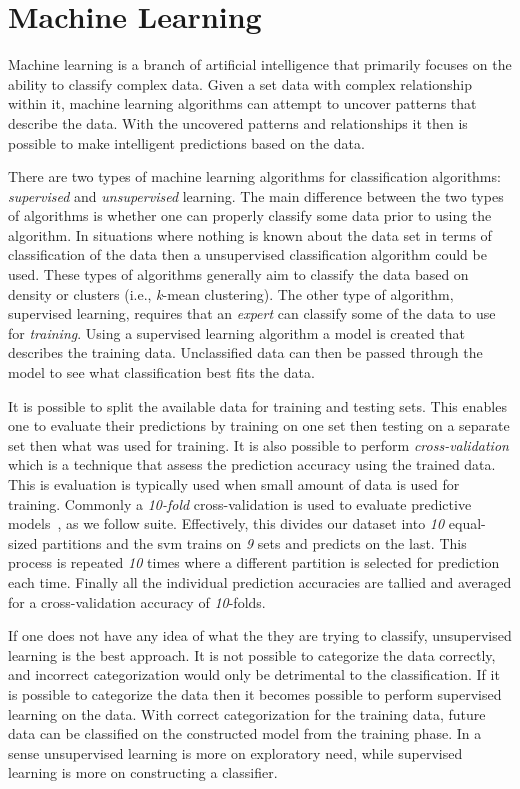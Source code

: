 \section{Machine Learning}
\label{sec:background_machine_learning}
Machine learning is a branch of artificial intelligence that primarily focuses on the ability to classify complex data. Given a set data with complex relationship within it, machine learning algorithms can attempt to uncover patterns that describe the data. With the uncovered patterns and relationships it then is possible to make intelligent predictions based on the data.

There are two types of machine learning algorithms for classification algorithms: \emph{supervised} and \emph{unsupervised} learning. The main difference between the two types of algorithms is whether one can properly classify some data prior to using the algorithm. In situations where nothing is known about the data set in terms of classification of the data then a unsupervised classification algorithm could be used. These types of algorithms generally aim to classify the data based on density or clusters (i.e., \emph{k}-mean clustering). The other type of algorithm, supervised learning, requires that an \emph{expert} can classify some of the data to use for \emph{training}. Using a supervised learning algorithm a model is created that describes the training data. Unclassified data can then be passed through the model to see what classification best fits the data.

It is possible to split the available data for training and testing sets. This enables one to evaluate their predictions by training on one set then testing on a separate set then what was used for training. It is also possible to perform \emph{cross-validation} which is a technique that assess the prediction accuracy using the trained data. This is evaluation is typically used when small amount of data is used for training. Commonly a \emph{10-fold} cross-validation is used to evaluate predictive models~\cite{Koh95}, as we follow suite. Effectively, this divides our dataset into \emph{10} equal-sized partitions and the \gls{svm} trains on \emph{9} sets and predicts on the last. This process is repeated \emph{10} times where a different partition is selected for prediction each time. Finally all the individual prediction accuracies are tallied and averaged for a cross-validation accuracy of \emph{10}-folds.

If one does not have any idea of what the they are trying to classify, unsupervised learning is the best approach. It is not possible to categorize the data correctly, and incorrect categorization would only be detrimental to the classification. If it is possible to categorize the data then it becomes possible to perform supervised learning on the data. With correct categorization for the training data, future data can be classified on the constructed model from the training phase. In a sense unsupervised learning is more on exploratory need, while supervised learning is more on constructing a classifier.

